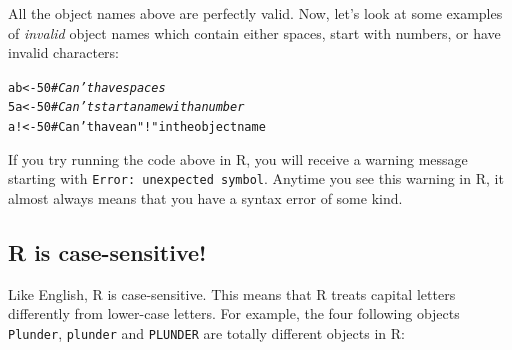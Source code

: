 \documentclass{tufte-book}\usepackage[]{graphicx}\usepackage[]{color}
\makeatletter
\newcommand{\hlstr}[1]{\textcolor[rgb]{0.192,0.494,0.8}{#1}}%
\newcommand{\hlcom}[1]{\textcolor[rgb]{0.678,0.584,0.686}{\textit{#1}}}%
\newenvironment{kframe}{%
 \def\at@end@of@kframe{}%
 \ifinner\ifhmode%
  \def\at@end@of@kframe{\end{minipage}}%
  \begin{minipage}{\columnwidth}%
 \fi\fi%
 \def\FrameCommand##1{\hskip\@totalleftmargin \hskip-\fboxsep
 \colorbox{shadecolor}{##1}\hskip-\fboxsep
     \hskip-\linewidth \hskip-\@totalleftmargin \hskip\columnwidth}%
 \MakeFramed {\advance\hsize-\width
   \@totalleftmargin\z@ \linewidth\hsize
   \@setminipage}}%
 {\par\unskip\endMakeFramed%
 \at@end@of@kframe}
\newenvironment{knitrout}{}{} %
\makeatother
\begin{document}
All the object names above are perfectly valid. Now, let's look at some examples of \textit{invalid} object names which contain either spaces, start with numbers, or have invalid characters:

\begin{knitrout}
\color{fgcolor}\begin{kframe}
\begin{alltt}
a b <- 50 \hlcom{# Can't have spaces}
5a <- 50 \hlcom{# Can't start a name with a number}
a! <- 5 0# Can't have an \hlstr{"!"} in the object name
\end{alltt}
\end{kframe}
\end{knitrout}

If you try running the code above in R, you will receive a warning message starting with \texttt{Error: unexpected symbol}. Anytime you see this warning in R, it almost always means that you have a syntax error of some kind.

\subsection{R is case-sensitive!}

Like English, R is case-sensitive. This means that R treats capital letters differently from lower-case letters. For example, the four following objects \texttt{Plunder}, \texttt{plunder} and \texttt{PLUNDER} are totally different objects in R:
\end{document}
